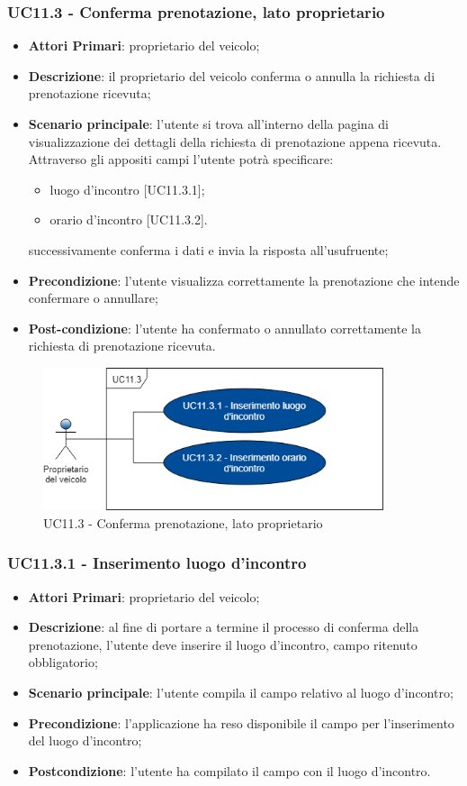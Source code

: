 \subsubsection{UC11.3 - Conferma prenotazione, lato proprietario}
\begin{itemize}
	\item \textbf{Attori Primari}: proprietario del veicolo;
	\item \textbf{Descrizione}: il proprietario del veicolo conferma o annulla la richiesta di prenotazione ricevuta;
	\item \textbf{Scenario principale}: l'utente si trova all'interno della pagina di visualizzazione dei dettagli della richiesta di prenotazione appena ricevuta. Attraverso gli appositi campi l'utente potrà specificare:
	\begin{itemize}
		\item luogo d'incontro [UC11.3.1];
		\item orario d'incontro [UC11.3.2].
	\end{itemize} 
	successivamente conferma i dati e invia la risposta all'usufruente;
	\item \textbf{Precondizione}: l'utente visualizza correttamente la prenotazione che intende confermare o annullare;
	\item \textbf{Post-condizione}: l'utente ha confermato o annullato correttamente la richiesta di prenotazione ricevuta.
\end{itemize}
\begin{figure}[h]
	\includegraphics[width=10cm]{res/images/UC11-3Conferma.png}
	\centering
	\caption{UC11.3 - Conferma prenotazione, lato proprietario}
\end{figure}

\subsubsection{UC11.3.1 - Inserimento luogo d'incontro}
\begin{itemize}
	\item \textbf{Attori Primari}: proprietario del veicolo;
	\item \textbf{Descrizione}: al fine di portare a termine il processo di conferma della prenotazione, l'utente deve inserire il luogo d'incontro, campo ritenuto obbligatorio;
	\item \textbf{Scenario principale}: l'utente compila il campo relativo al luogo d'incontro;	
	\item \textbf{Precondizione}: l'applicazione ha reso disponibile il campo per l'inserimento del luogo d'incontro;
	\item \textbf{Postcondizione}: l'utente ha compilato il campo con il luogo d'incontro.	
\end{itemize}

